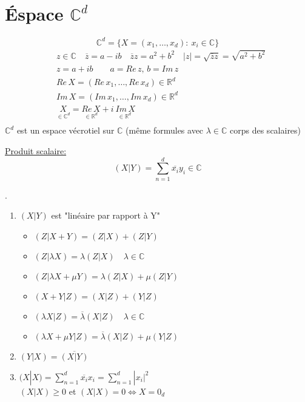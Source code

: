 \documentclass[a4paper]{report}
\newcommand\R{\ensuremath{\mathbb{R}}}
\newcommand\C{\ensuremath{\mathbb{C}}}
\let\iff\Leftrightarrow
\theoremstyle{definition}
\begin{document}
\section{Éspace $\C^d$}
\begin{definition}
    \[
        \C^d = \{ X = (x_1, \ldots, x_d): \: x_i \in \C\}
    \] 
    \begin{align*}
    &z \in \C \quad \overline{z} = a - ib \quad \overline{z}z = a^2 + b^2 \quad |z| = \sqrt{\overline{z}z} = \sqrt{a^2 + b^2}  \\
    &z = a + ib \qquad a = Re\,z,\,b = Im\,z\\
    &Re\,X = (Re\,x_1, \ldots, Re\,x_d) \in \R^d\\
    &Im\,X = (Im\,x_1, \ldots, Im\,x_d) \in \R^d\\
    &\underset{\in \C^d}{X} = \underset{\in \R^d}{Re\,X} + i\underset{\in \R^d}{\:Im\,X}\\
    \end{align*}
    $\C^d$ est un espace vécrotiel sur  $\C$ (même formules avec $\lambda \in \C$ corps des scalaires)
\end{definition}
\begin{definition}
    \underline{Produit scalaire:}
    \[
        (X|Y) = \sum_{n=1}^{d} \overline{x_i}y_i \in \C
    \] 
\end{definition}
\begin{prop}
   . 
   \begin{enumerate}
       \item $(X|Y)$ est "linéaire par rapport à Y"
           \begin{itemize}
               \item $(Z|X + Y) = (Z|X) + (Z|Y)$
               \item $(Z|\lambda X) = \lambda(Z|X) \quad \lambda \in \C$
               \item  $(Z|\lambda X + \mu Y) = \lambda(Z|X) + \mu(Z|Y)$
               \item  $(X + Y|Z) = (X|Z) + (Y|Z)$
               \item $(\lambda X|Z) = \overline{\lambda}(X|Z) \quad \lambda \in \C$
               \item $(\lambda X + \mu Y|Z) = \overline{\lambda}(X|Z) + \mu(Y|Z)$
           \end{itemize}
       \item $(Y|X) = \overline{(X|Y)}$
       \item $(X|X) = \sum_{n=1}^{d} \overline{x_i}x_i = \sum_{n=1}^{d} |x_i|^2$\\
           $(X|X) \ge 0$ et $(X|X) = 0 \iff X = 0_d$
   \end{enumerate}
\end{prop}
\end{document}
